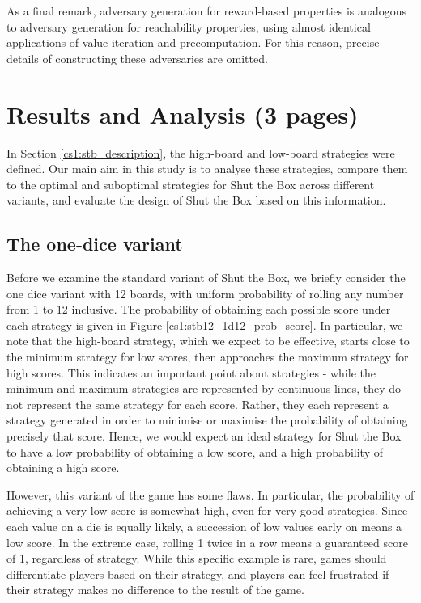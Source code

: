 As a final remark, adversary generation for reward-based properties is analogous to adversary generation for reachability properties, using almost identical applications of value iteration and precomputation. For this reason, precise details of constructing these adversaries are omitted.


\section{Results and Analysis (3 pages)}
\label{cs1:stb_results}

In Section \ref{cs1:stb_description}, the high-board and low-board strategies were defined. Our main aim in this study is to analyse these strategies, compare them to the optimal and suboptimal strategies for Shut the Box across different variants, and evaluate the design of Shut the Box based on this information.

\subsection{The one-dice variant}
\label{cs1:stb_one_dice}

Before we examine the standard variant of Shut the Box, we briefly consider the one dice variant with 12 boards, with uniform probability of rolling any number from 1 to 12 inclusive. The probability of obtaining each possible score under each strategy is given in Figure \ref{cs1:stb12_1d12_prob_score}. In particular, we note that the high-board strategy, which we expect to be effective, starts close to the minimum strategy for low scores, then approaches the maximum strategy for high scores. This indicates an important point about strategies - while the minimum and maximum strategies are represented by continuous lines, they do not represent the same strategy for each score. Rather, they each represent a strategy generated in order to minimise or maximise the probability of obtaining precisely that score. Hence, we would expect an ideal strategy for Shut the Box to have a low probability of obtaining a low score, and a high probability of obtaining a high score.

However, this variant of the game has some flaws. In particular, the probability of achieving a very low score is somewhat high, even for very good strategies. Since each value on a die is equally likely, a succession of low values early on means a low score. In the extreme case, rolling 1 twice in a row means a guaranteed score of 1, regardless of strategy. While this specific example is rare, games should differentiate players based on their strategy, and players can feel frustrated if their strategy makes no difference to the result of the game.

